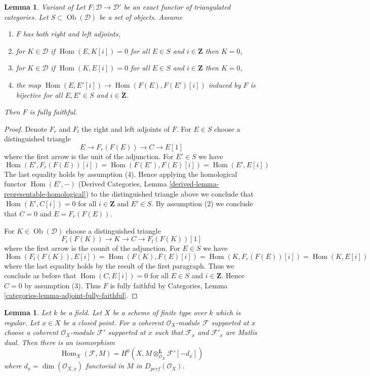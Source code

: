 \documentclass{stacks-project}
\newenvironment{reference}{\comment}{\endcomment}
\theoremstyle{plain}
\newtheorem{lemma}[subsection]{Lemma}
\theoremstyle{definition}
\theoremstyle{remark}
\numberwithin{equation}{subsection}
\def\Hom{\mathop{\mathrm{Hom}}\nolimits}
\def\Ob{\mathop{\mathrm{Ob}}\nolimits}
\begin{document}
\begin{lemma}
\label{lemma-get-fully-faithful}
\begin{reference}
Variant of \cite[Lemma 2.15]{Orlov-K3}
\end{reference}
Let $F : \mathcal{D} \to \mathcal{D}'$ be an exact functor of
triangulated categories. Let $S \subset \Ob(\mathcal{D})$ be
a set of objects. Assume
\begin{enumerate}
\item $F$ has both right and left adjoints,
\item for $K \in \mathcal{D}$ if $\Hom(E, K[i]) = 0$ for all
$E \in S$ and $i \in \mathbf{Z}$ then $K = 0$,
\item for $K \in \mathcal{D}$ if $\Hom(K, E[i]) = 0$ for all
$E \in S$ and $i \in \mathbf{Z}$ then $K = 0$,
\item the map $\Hom(E, E'[i]) \to \Hom(F(E), F(E')[i])$ induced by $F$
is bijective for all $E, E' \in S$ and $i \in \mathbf{Z}$.
\end{enumerate}
Then $F$ is fully faithful.
\end{lemma}

\begin{proof}
Denote $F_r$ and $F_l$ the right and left adjoints of $F$. For
$E \in S$ choose a distinguished triangle
$$
E \to F_r(F(E)) \to C \to E[1]
$$
where the first arrow is the unit of the adjunction. For $E' \in S$ we have
$$
\Hom(E', F_r(F(E))[i]) = \Hom(F(E'), F(E)[i]) = \Hom(E', E[i])
$$
The last equality holds by assumption (4).
Hence applying the homological functor $\Hom(E', -)$
(Derived Categories, Lemma \ref{derived-lemma-representable-homological})
to the distinguished triangle above we conclude that $\Hom(E', C[i]) = 0$
for all $i \in \mathbf{Z}$ and $E' \in S$. By assumption (2) we conclude
that $C = 0$ and $E = F_r(F(E))$.

\medskip\noindent
For $K \in \Ob(\mathcal{D})$ choose a distinguished triangle
$$
F_l(F(K)) \to K \to C \to F_l(F(K))[1]
$$
where the first arrow is the counit of the adjunction. For $E \in S$
we have
$$
\Hom(F_l(F(K)), E[i]) = \Hom(F(K), F(E)[i]) =
\Hom(K, F_r(F(E))[i]) = \Hom(K, E[i])
$$
where the last equality holds by the result of the first paragraph.
Thus we conclude as before that $\Hom(C, E[i]) = 0$ for all $E \in S$
and $i \in \mathbf{Z}$. Hence $C = 0$ by assumption (3).
Thus $F$ is fully faithful by Categories, Lemma
\ref{categories-lemma-adjoint-fully-faithful}.
\end{proof}

\begin{lemma}
\label{lemma-duality-at-point}
Let $k$ be a field. Let $X$ be a scheme of finite type over $k$ which
is regular. Let $x \in X$ be a closed point. For a coherent
$\mathcal{O}_X$-module $\mathcal{F}$ supported at $x$ choose
a coherent $\mathcal{O}_X$-module $\mathcal{F}'$ supported at $x$
such that $\mathcal{F}_x$ and $\mathcal{F}'_x$ are Matlis dual.
Then there is an isomorphism
$$
\Hom_X(\mathcal{F}, M) =
H^0(X, M \otimes_{\mathcal{O}_X}^\mathbf{L} \mathcal{F}'[-d_x])
$$
where $d_x = \dim(\mathcal{O}_{X, x})$
functorial in $M$ in $D_{perf}(\mathcal{O}_X)$.
\end{lemma}
\end{document}

